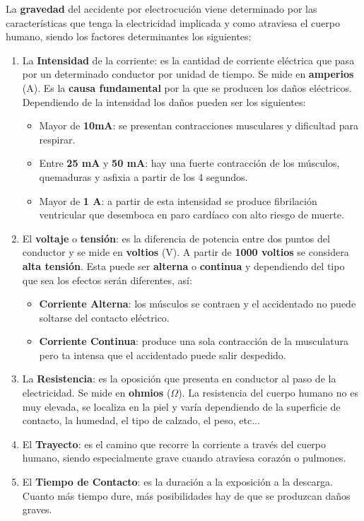 La \textbf{gravedad} del accidente por electrocución viene determinado por las características que tenga la electricidad implicada y como atraviesa el cuerpo humano, siendo los factores determinantes los siguientes:

\begin{enumerate}
    \item La \textbf{Intensidad} de la corriente: es la cantidad de corriente eléctrica que pasa por un determinado conductor por unidad de tiempo. Se mide en \textbf{amperios} (A). Es la \textbf{causa fundamental} por la que se producen los daños eléctricos.  Dependiendo de la intensidad los daños pueden ser los siguientes:
    \begin{itemize}
        \item Mayor de \textbf{10mA}: se presentan contracciones musculares y dificultad para respirar.
        \item Entre \textbf{25 mA} y \textbf{50 mA}: hay una fuerte contracción de los músculos, quemaduras y asfixia a partir de los 4 segundos.
        \item Mayor de \textbf{1 A}: a partir de esta intensidad se produce fibrilación ventricular que desemboca en paro cardíaco con alto riesgo de muerte.
    \end{itemize}
    \item El \textbf{voltaje} o \textbf{tensión}: es la diferencia de potencia entre dos puntos del conductor y se mide en \textbf{voltios} (V). A partir de \textbf{1000 voltios} se considera \textbf{alta tensión}. Esta puede ser \textbf{alterna} o \textbf{continua} y dependiendo del tipo que sea los efectos serán diferentes, así:
    \begin{itemize}
        \item \textbf{Corriente Alterna}: los músculos se contraen y el accidentado no puede soltarse del contacto eléctrico.
        \item \textbf{Corriente Continua}: produce una sola contracción de la musculatura pero ta intensa que el accidentado puede salir despedido.
    \end{itemize}
    \item La \textbf{Resistencia}: es la oposición que presenta en conductor al paso de la electricidad. Se mide en \textbf{ohmios} ($\Omega$). La resistencia del cuerpo humano no es muy elevada, se localiza en la piel y varía dependiendo de la superficie de contacto, la humedad, el tipo de calzado, el peso, etc...
    \item El \textbf{Trayecto}: es el camino que recorre la corriente a través del cuerpo humano, siendo especialmente grave cuando atraviesa corazón o pulmones.
    \item El \textbf{Tiempo de Contacto}: es la duración a la exposición a la descarga. Cuanto más tiempo dure, más posibilidades hay de que se produzcan daños graves.
\end{enumerate}

